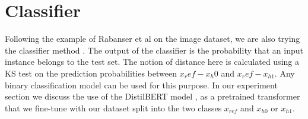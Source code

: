 \documentclass[12pt]{report}
\begin{document}
%
%
%
%

\section{Classifier}
Following the example of Rabanser et al \cite{rabanserFailingLoudlyEmpirical2019a} on the image dataset, we are also trying the classifier method \cite{lopez-pazRevisitingClassifierTwoSample2018}.
The output of the classifier is the probability that an input instance belongs to the test set.
The notion of distance here is calculated using a KS test on the prediction probabilities between \(x_ref - x_h0\) and \(x_ref - x_{h1}\).
Any binary classification model can be used for this purpose.
In our experiment section we discuss the use of the DistilBERT model \cite{sanhDistilBERTDistilledVersion2020}, as a pretrained transformer that we fine-tune with our dataset split into the two classes \(x_{ref}\) and \(x_{h0}\) or \(x_{h1}\).

%
%
\end{document}

